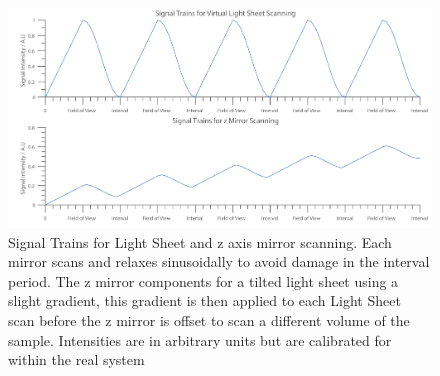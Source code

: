 \begin{figure}
\centering
\includegraphics[width=\linewidth]{Figures/Signals}
\caption[Light Sheet Signal Trains]{Signal Trains for Light Sheet and z axis mirror scanning.
Each mirror scans and relaxes sinusoidally to avoid damage in the interval period.
The z mirror components for a tilted light sheet using a slight gradient, this gradient is then applied to each Light Sheet scan before the z mirror is offset to scan a different volume of the sample.
Intensities are in arbitrary units but are calibrated for within the real system}
\label{fig:Signals}
\end{figure}


%
%

